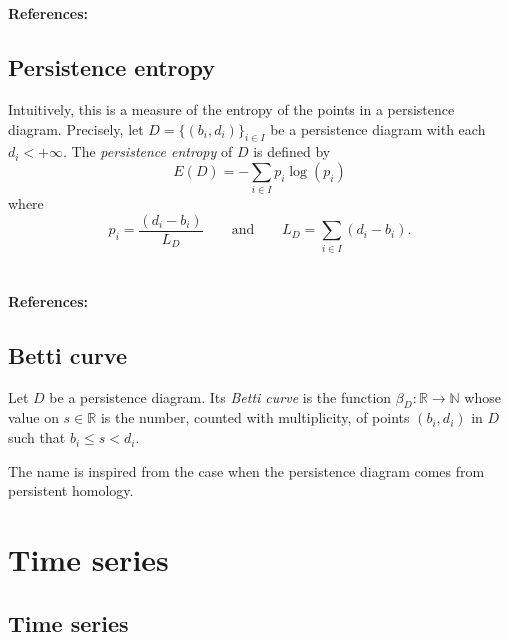 \documentclass{amsart}
\begin{document}
	\paragraph{\\ References:} \cite{reininghaus2015stable,adams2017persistence}
	
	\subsection*{Persistence entropy} \label{persistence_entropy}
	
	Intuitively, this is a measure of the entropy of the points in a
	persistence diagram. Precisely, let $D = \{(b_i, d_i)\}_{i \in I}$ be a persistence diagram with each $d_i < +\infty$. The \textit{persistence entropy} of $D$ is defined by
	\begin{equation*}
	E(D) = - \sum_{i \in I} p_i \log(p_i)
	\end{equation*}
	where
	\begin{equation*}
	p_i = \frac{(d_i - b_i)}{L_D} \qquad \text{and} \qquad L_D = \sum_{i \in I} (d_i - b_i) . 
	\end{equation*}
	
	\paragraph{\\ References:} \cite{rucco2016characterisation}
	
	\subsection*{Betti curve} \label{betti_curve}
	
	Let $D$ be a 
	persistence diagram. Its \textit{Betti curve} is the function $\beta_D : \mathbb R \to \mathbb N$ whose value on $s \in \mathbb R$ is the number, counted with multiplicity, of points $(b_i,d_i)$ in $D$ such that $b_i \leq s <d_i$.
	
	The name is inspired from the case when the persistence diagram comes from persistent homology.
	
	\section{Time series}
	
	\subsection*{Time series} \label{time_series}
	
\end{document}
